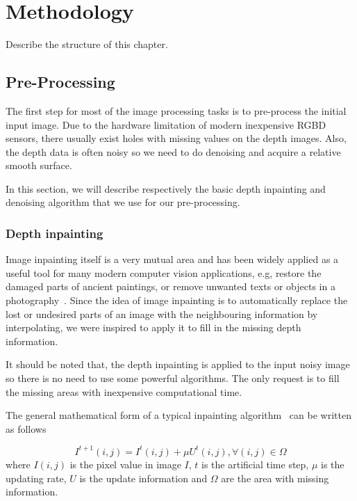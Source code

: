 \chapter{Methodology} \label{chap:methodology}
Describe the structure of this chapter.
\section{Pre-Processing}
The first step for most of the image processing tasks is to pre-process the initial input image. 
Due to the hardware limitation of modern inexpensive RGBD sensors, there usually exist holes with missing values on the depth images. 
Also, the depth data is often noisy so we need to do denoising and acquire a relative smooth surface.

In this section, we will describe respectively the basic depth inpainting and denoising algorithm that we use for our pre-processing. 
\subsection{Depth inpainting}
Image inpainting itself is a very mutual area and has been widely applied as a useful tool for many modern computer vision applications, e.g, restore the damaged parts of ancient paintings, or remove unwanted texts or objects in a photography~\cite{bertalmio2000image}. 
Since the idea of image inpainting is to automatically replace the lost or undesired parts of an image with the neighbouring information by interpolating, we were inspired to apply it to fill in the missing depth information.

It should be noted that, the depth inpainting is applied to the input noisy image so there is no need to use some powerful algorithms.
The only request is to fill the missing areas with inexpensive computational time.

The general mathematical form of a typical inpainting algorithm~\cite{bertalmio2000image} can be written as follows

\begin{equation}
I^{t+1}(i,j) = I^{t}(i,j) + \mu U^{t}(i,j), \forall(i,j)\in \Omega
\end{equation}
where $I(i,j)$ is the pixel value in image $I$, $t$ is the artificial time step, $\mu$ is the updating rate, $U$ is the update information and $\Omega$ are the area with missing information.

